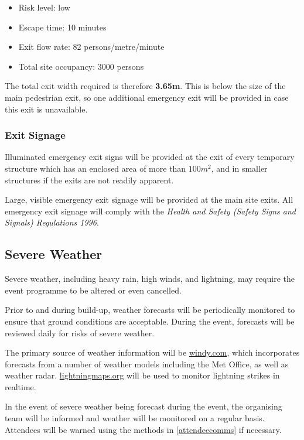 \begin{itemize}
    \tightlist
    \item Risk level: low
    \item Escape time: 10 minutes
    \item Exit flow rate: 82 persons/metre/minute
    \item Total site occupancy: 3000 persons
\end{itemize}

The total exit width required is therefore \textbf{3.65m}. This is below the size of the
main pedestrian exit, so one additional emergency exit will be provided in case this exit
is unavailable.

\subsubsection{Exit Signage}

Illuminated emergency exit signs will be provided at the exit of every temporary structure which
has an enclosed area of more than $100m^2$, and in smaller structures if the exits are not
readily apparent.

Large, visible emergency exit signage will be provided at the main site exits. All emergency exit
signage will comply with the \textit{Health and Safety (Safety Signs and Signals) Regulations 1996}.

\subsection{Severe Weather}
\label{severe-weather}
Severe weather, including heavy rain, high winds, and lightning, may require the event
programme to be altered or even cancelled.

Prior to and during build-up, weather forecasts will be periodically monitored to ensure
that ground conditions are acceptable. During the event, forecasts will be reviewed
daily for risks of severe weather.

The primary source of weather information will be \href{https://windy.com}{windy.com}, which
incorporates forecasts from a number of weather models including the Met Office, as well as
weather radar. \href{https://lightningmaps.org}{lightningmaps.org} will be used to monitor
lightning strikes in realtime.

In the event of severe weather being forecast during the event, the organising team will
be informed and weather will be monitored on a regular basis. Attendees will be warned
using the methods in \cref{attendeecomms} if necessary.

